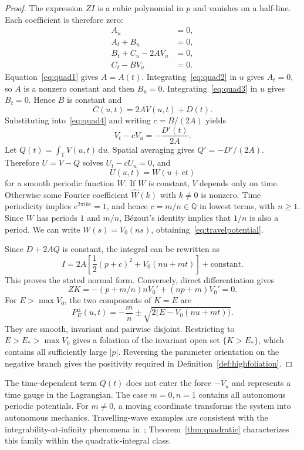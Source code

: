\documentclass[review,12pt,times,a4paper,nopreprintline]{elsarticle}
\theoremstyle{plain}
\theoremstyle{definition}
\theoremstyle{remark}
\newcommand{\T}{\mathbb T}
\newcommand{\dd}{\,\mathrm d}
\numberwithin{equation}{section}
\begin{document}
\begin{proof}
The expression $ZI$ is a cubic polynomial in $p$ and vanishes on a half-line. Each coefficient is therefore zero:
\begin{align}
 A_u&=0,\label{eq:quad1}\\
 A_t+B_u&=0,\label{eq:quad2}\\
 B_t+C_u-2AV_u&=0,\label{eq:quad3}\\
 C_t-BV_u&=0.\label{eq:quad4}
\end{align}
Equation~\eqref{eq:quad1} gives $A=A(t)$. Integrating~\eqref{eq:quad2} in $u$ gives $A_t=0$, so $A$ is a nonzero constant and then $B_u=0$. Integrating~\eqref{eq:quad3} in $u$ gives $B_t=0$. Hence $B$ is constant and
\[
 C(u,t)=2AV(u,t)+D(t).
\]
Substituting into~\eqref{eq:quad4} and writing $c=B/(2A)$ yields
\begin{equation}\label{eq:travelpde}
 V_t-cV_u=-\frac{D'(t)}{2A}.
\end{equation}
Let $Q(t)=\int_{\T}V(u,t)\dd u$. Spatial averaging gives $Q'=-D'/(2A)$. Therefore $U=V-Q$ solves $U_t-cU_u=0$, and
\[
 U(u,t)=W(u+ct)
\]
for a smooth periodic function $W$. If $W$ is constant, $V$ depends only on time. Otherwise some Fourier coefficient $\widehat W(k)$ with $k\ne0$ is nonzero. Time periodicity implies $e^{2\pi i kc}=1$, and hence $c=m/n\in\mathbb Q$ in lowest terms, with $n\geq1$. Since $W$ has periods $1$ and $m/n$, B\'ezout's identity implies that $1/n$ is also a period. We can write $W(s)=V_0(ns)$, obtaining~\eqref{eq:travelpotential}.

Since $D+2AQ$ is constant, the integral can be rewritten as
\[
 I=2A\left[\frac12(p+c)^2+V_0(nu+mt)\right]+\mathrm{constant}.
\]
This proves the stated normal form. Conversely, direct differentiation gives
\[
 ZK=-(p+m/n)nV_0'+(np+m)V_0'=0.
\]
For $E>\max V_0$, the two components of $K=E$ are
\begin{equation}\label{eq:travelgraphs}
 P_E^\pm(u,t)=-\frac mn
 \pm\sqrt{2\bigl(E-V_0(nu+mt)\bigr)}.
\end{equation}
They are smooth, invariant and pairwise disjoint. Restricting to $E>E_*>\max V_0$ gives a foliation of the invariant open set $\{K>E_*\}$, which contains all sufficiently large $|p|$. Reversing the parameter orientation on the negative branch gives the positivity required in Definition~\ref{def:highfoliation}.
\end{proof}

The time-dependent term $Q(t)$ does not enter the force $-V_u$ and represents a time gauge in the Lagrangian. The case $m=0,n=1$ contains all autonomous periodic potentials. For $m\ne0$, a moving coordinate transforms the system into autonomous mechanics. Travelling-wave examples are consistent with the integrability-at-infinity phenomena in~\cite{BialyInfinity,OpenProblems2026}; Theorem~\ref{thm:quadratic} characterizes this family within the quadratic-integral class.
\end{document}
